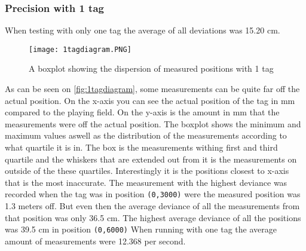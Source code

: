 \subsubsection{Precision with 1 tag} 
When testing with only one tag the average of all deviations was 15.20 cm.
\begin{figure}[H]
    \centering
    \texttt{[image: 1tagdiagram.PNG]}
    \caption{A boxplot showing the dispersion of measured positions with 1 tag}
    \label{fig:1tagdiagram}
\end{figure}
As can be seen on \autoref{fig:1tagdiagram}, some measurements can be quite far off the actual position. 
On the x-axis you can see the actual position of the tag in mm compared to the playing field.
On the y-axis is the amount in mm that the measurements were off the actual position.
The boxplot shows the minimum and maximum values aswell as the distribution of the measurements according to what quartile it is in.
The box is the measurements withing first and third quartile and the whiskers that are extended out from it is the measurements on outside of the these quartiles.
Interestingly it is the positions closest to x-axis that is the most inaccurate.
The measurement with the highest deviance was recorded when the tag was in position \texttt{(0,3000)} were the measured position was 1.3 meters off.
But even then the average deviance of all the measurements from that position was only 36.5 cm.
The highest average deviance of all the positions was 39.5 cm in position \texttt{(0,6000)}
When running with one tag the average amount of measurements were 12.368 per second.
 

